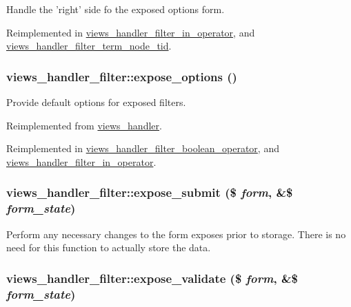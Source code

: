 Handle the 'right' side fo the exposed options form. 

Reimplemented in \hyperlink{classviews__handler__filter__in__operator_512acf0d0d577f3c87882d08e9808880}{views\_\-handler\_\-filter\_\-in\_\-operator}, and \hyperlink{classviews__handler__filter__term__node__tid_6a3523271cc4bd41ae944dd38bf24b37}{views\_\-handler\_\-filter\_\-term\_\-node\_\-tid}.\hypertarget{classviews__handler__filter_07ab6afc47bf892fb5fd5934c3f1d64c}{
\subsubsection[{expose\_\-options}]{\setlength{\rightskip}{0pt plus 5cm}views\_\-handler\_\-filter::expose\_\-options ()}}
\label{classviews__handler__filter_07ab6afc47bf892fb5fd5934c3f1d64c}


Provide default options for exposed filters. 

Reimplemented from \hyperlink{classviews__handler_2db9f3127a5364b17fb775cede2f43a6}{views\_\-handler}.

Reimplemented in \hyperlink{classviews__handler__filter__boolean__operator_24ff1f565f02838bc2a63939ab510d89}{views\_\-handler\_\-filter\_\-boolean\_\-operator}, and \hyperlink{classviews__handler__filter__in__operator_0ed328117721ce41a3744f0339c16527}{views\_\-handler\_\-filter\_\-in\_\-operator}.\hypertarget{classviews__handler__filter_4b18e3bdbb306d4932bdf612893845c9}{
\subsubsection[{expose\_\-submit}]{\setlength{\rightskip}{0pt plus 5cm}views\_\-handler\_\-filter::expose\_\-submit (\$ {\em form}, \/  \&\$ {\em form\_\-state})}}
\label{classviews__handler__filter_4b18e3bdbb306d4932bdf612893845c9}


Perform any necessary changes to the form exposes prior to storage. There is no need for this function to actually store the data. \hypertarget{classviews__handler__filter_30b7f718c7c152dfedb3fc444bd1304c}{
\subsubsection[{expose\_\-validate}]{\setlength{\rightskip}{0pt plus 5cm}views\_\-handler\_\-filter::expose\_\-validate (\$ {\em form}, \/  \&\$ {\em form\_\-state})}}
\label{classviews__handler__filter_30b7f718c7c152dfedb3fc444bd1304c}


